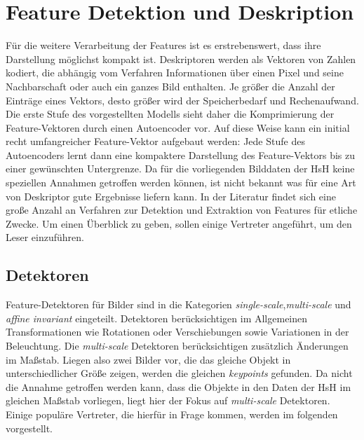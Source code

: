 \section{Feature Detektion und Deskription}
\label{extraction}

Für die weitere Verarbeitung der Features ist es erstrebenswert, dass ihre Darstellung möglichst kompakt ist. Deskriptoren werden als Vektoren von Zahlen kodiert, die abhängig vom Verfahren Informationen über einen Pixel und seine Nachbarschaft oder auch ein ganzes Bild enthalten. Je größer die Anzahl der Einträge eines Vektors, desto größer wird der Speicherbedarf und Rechenaufwand.
Die erste Stufe des vorgestellten Modells sieht daher die Komprimierung der Feature-Vektoren durch einen Autoencoder vor. Auf diese Weise kann ein initial recht umfangreicher Feature-Vektor aufgebaut werden: Jede Stufe des Autoencoders lernt dann eine kompaktere Darstellung des Feature-Vektors bis zu einer gewünschten Untergrenze.\newline
Da für die vorliegenden Bilddaten der HsH keine speziellen Annahmen getroffen werden können, ist nicht bekannt was für eine Art von Deskriptor gute Ergebnisse liefern kann. In der Literatur findet sich eine große Anzahl an Verfahren zur Detektion und Extraktion von Features für etliche Zwecke. Um einen Überblick zu geben, sollen einige Vertreter angeführt, um den Leser einzuführen.

\subsection{Detektoren}

Feature-Detektoren für Bilder sind in die Kategorien \textit{single-scale},\textit{multi-scale} und \textit{affine invariant} eingeteilt. Detektoren berücksichtigen im Allgemeinen Transformationen wie Rotationen oder Verschiebungen sowie Variationen in der Beleuchtung. Die \textit{multi-scale} Detektoren berücksichtigen zusätzlich Änderungen im Maßstab. Liegen also zwei Bilder vor, die das gleiche Objekt in unterschiedlicher Größe zeigen, werden die gleichen \textit{keypoints} gefunden. Da nicht die Annahme getroffen werden kann, dass die Objekte in den Daten der HsH im gleichen Maßstab vorliegen, liegt hier der Fokus auf \textit{multi-scale} Detektoren. Einige populäre Vertreter, die hierfür in Frage kommen, werden im folgenden vorgestellt.

